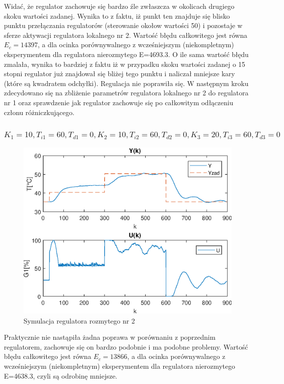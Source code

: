 Widać, że regulator zachowuje się bardzo źle zwłaszcza w okolicach drugiego skoku wartości zadanej. Wynika to z faktu, iż punkt ten znajduje się blisko punktu przełączania regulatorów (sterowanie okołow wartości 50) i pozostaje w sferze aktywacji regulatora lokalnego nr 2. Wartość błędu całkowitego jest równa $E_{c}=\num{14397}$, a dla ocinka porównywalnego z wcześniejszym (niekompletnym) eksperymentem dla regulatora nierozmytego E=\num{4693,3}. O ile sama wartość błędu zmalała, wynika to bardziej z faktu iż w przypadku skoku wartości zadanej o 15 stopni regulator już znajdował się bliżej tego punktu i naliczał mniejsze kary (które są kwadratem odchyłki). Regulacja nie poprawiła się. W następnym kroku zdecydowano się na zbliżenie parametrów regulatora lokalnego nr 2 do regulatora nr 1 oraz sprawdzenie jak regulator zachowuje się po całkowitym odłączeniu członu różniczkującego.

\FloatBarrier

\subsubsection{$K_{1}=\num{10},T_{i1}=\num{60},T_{d1}=\num{0}, K_{2}=\num{10},T_{i2}=\num{60},T_{d2}=\num{0}, K_{3}=\num{20},T_{i3}=\num{60},T_{d3}=\num{0}$ }


\begin{figure}[h!]
	\centering
	\includegraphics[scale=1]{Rys/PID3.eps}
	\caption{Symulacja regulatora rozmytego nr 2}
	\label{pid3}
\end{figure}

\FloatBarrier
Praktycznie nie nastąpiła żadna poprawa w porównaniu z poprzednim regulatorem, zachowuje się on bardzo podobnie i ma podobne problemy. Wartość błędu całkowitego jest równa $E_{c}=\num{13866}$, a dla ocinka porównywalnego z wcześniejszym (niekompletnym) eksperymentem dla regulatora nierozmytego E=\num{4638,3}, czyli są odrobinę mniejsze.



